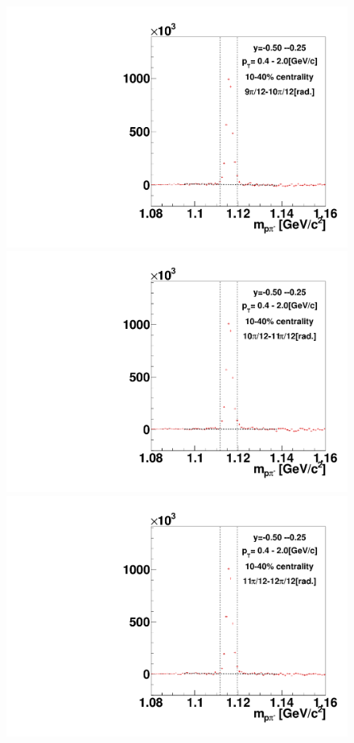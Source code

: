 \begin{figure}[h]
\includegraphics[width=0.14\linewidth]{chapterX/fig/ld_v2_sig/kf_ptslice0_cent1_ld_flow_phi10_rap3.pdf}
\includegraphics[width=0.14\linewidth]{chapterX/fig/ld_v2_sig/kf_ptslice0_cent1_ld_flow_phi11_rap3.pdf}
\includegraphics[width=0.14\linewidth]{chapterX/fig/ld_v2_sig/kf_ptslice0_cent1_ld_flow_phi12_rap3.pdf}


\end{figure}
